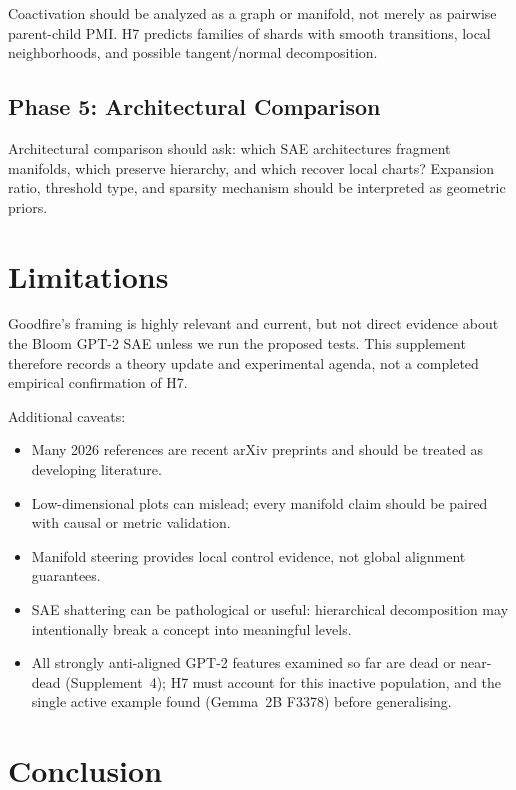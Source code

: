 \documentclass[11pt,a4paper]{article}
\begin{document}
Coactivation should be analyzed as a graph or manifold, not merely as pairwise parent-child PMI. H7 predicts families of shards with smooth transitions, local neighborhoods, and possible tangent/normal decomposition.

\subsection{Phase 5: Architectural Comparison}

Architectural comparison should ask: which SAE architectures fragment manifolds, which preserve hierarchy, and which recover local charts? Expansion ratio, threshold type, and sparsity mechanism should be interpreted as geometric priors.

\section{Limitations}
\label{sec:limitations}

\begin{warningbox}
Goodfire's framing is highly relevant and current, but not direct evidence about the Bloom GPT-2 SAE unless we run the proposed tests. This supplement therefore records a theory update and experimental agenda, not a completed empirical confirmation of H7.
\end{warningbox}

Additional caveats:
\begin{itemize}[noitemsep]
  \item Many 2026 references are recent arXiv preprints and should be treated as developing literature.
  \item Low-dimensional plots can mislead; every manifold claim should be paired with causal or metric validation.
  \item Manifold steering provides local control evidence, not global alignment guarantees.
  \item SAE shattering can be pathological or useful: hierarchical decomposition may intentionally break a concept into meaningful levels.
  \item All strongly anti-aligned GPT-2 features examined so far are dead or near-dead (Supplement~4); H7 must account for this inactive population, and the single active example found (Gemma~2B F3378) before generalising.
\end{itemize}

\section{Conclusion}
\label{sec:conclusion}
\end{document}
